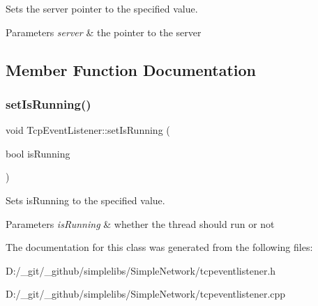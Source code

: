 Sets the server pointer to the specified value. 


\begin{DoxyParams}{Parameters}
{\em server} & the pointer to the server \\
\hline
\end{DoxyParams}


\subsection{Member Function Documentation}
\mbox{\label{class_tcp_event_listener_aac35550b2da7ba7b4f27e8dd169a436b}} 
\subsubsection{\texorpdfstring{setIsRunning()}{setIsRunning()}}
{\footnotesize\ttfamily void Tcp\+Event\+Listener\+::set\+Is\+Running (\begin{DoxyParamCaption}\item[{bool}]{is\+Running }\end{DoxyParamCaption})}



Sets is\+Running to the specified value. 


\begin{DoxyParams}{Parameters}
{\em is\+Running} & whether the thread should run or not \\
\hline
\end{DoxyParams}


The documentation for this class was generated from the following files\+:\begin{DoxyCompactItemize}
\item 
D\+:/\+\_\+git/\+\_\+github/simplelibs/\+Simple\+Network/tcpeventlistener.\+h\item 
D\+:/\+\_\+git/\+\_\+github/simplelibs/\+Simple\+Network/tcpeventlistener.\+cpp\end{DoxyCompactItemize}
